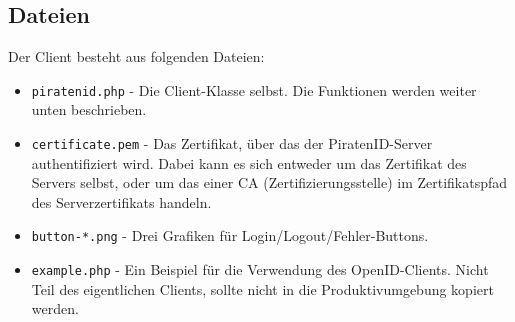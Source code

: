 \documentclass[parskip=half]{scrartcl}
\begin{document}
\subsection{Dateien}
Der Client besteht aus folgenden Dateien:
\begin{itemize}
	\item \texttt{piratenid.php} -
		Die Client-Klasse selbst. Die Funktionen werden weiter unten beschrieben.
	\item \texttt{certificate.pem} - 
		Das Zertifikat, über das der PiratenID-Server authentifiziert wird.
		Dabei kann es sich entweder um das Zertifikat des Servers selbst,
		oder um das einer CA (Zertifizierungsstelle) im Zertifikatspfad des Serverzertifikats handeln.
	\item \texttt{button-*.png} -
		Drei Grafiken für Login/Logout/Fehler-Buttons.
	\item \texttt{example.php} -
		Ein Beispiel für die Verwendung des OpenID-Clients. Nicht Teil des eigentlichen Clients, sollte nicht in die Produktivumgebung kopiert werden.
\end{itemize}
\end{document}
